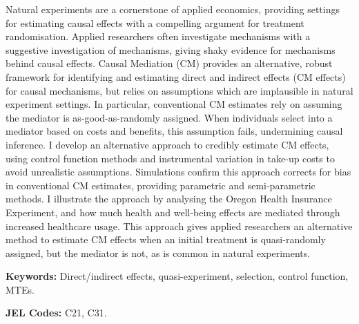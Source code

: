 \noindent
Natural experiments are a cornerstone of applied economics, providing settings for estimating causal effects with a compelling argument for treatment randomisation.
Applied researchers often investigate mechanisms with a suggestive investigation of mechanisms, giving shaky evidence for mechanisms behind causal effects.
Causal Mediation (CM) provides an alternative, robust framework for identifying and estimating direct and indirect effects (CM effects) for causal mechanisms, but relies on assumptions which are implausible in natural experiment settings.
In particular, conventional CM estimates rely on assuming the mediator is as-good-as-randomly assigned.
When individuals select into a mediator based on costs and benefits, this assumption fails, undermining causal inference.
I develop an alternative approach to credibly estimate CM effects, using control function methods and instrumental variation in take-up costs to avoid unrealistic assumptions.
Simulations confirm this approach corrects for bias in conventional CM estimates, providing parametric and semi-parametric methods.
I illustrate the approach by analysing the Oregon Health Insurance Experiment, and how much health and well-being effects are mediated through increased healthcare usage.
This approach gives applied researchers an alternative method to estimate CM effects when an initial treatment is quasi-randomly assigned, but the mediator is not, as is common in natural experiments.

\vspace{0.5cm}
\noindent
\textbf{Keywords:}
Direct/indirect effects, quasi-experiment, selection, control function, MTEs.

\vspace{0.1cm}
\noindent
\textbf{JEL Codes:}
C21, C31.
